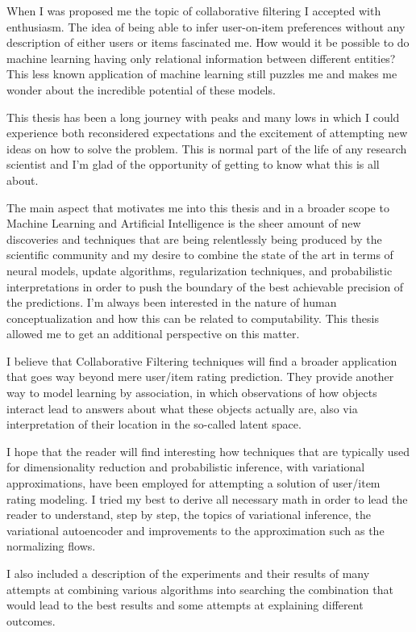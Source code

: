 
When I was proposed me the topic
of collaborative filtering
I accepted with enthusiasm.
The idea of being able to infer user-on-item preferences
without any description of either users
or items fascinated me. How would it be
possible to do machine learning
having only relational information between different
entities? This less known application of machine learning still puzzles me and makes me
wonder about the incredible potential of these models.

This thesis has been a long journey with peaks and many lows in which I could
experience both reconsidered expectations and the excitement of attempting new 
ideas on how to solve the problem. 
This is normal part of the life of any research scientist
and I'm glad of the opportunity of getting to know what this is all about.

The main aspect that motivates me into this thesis and in a broader scope to
Machine Learning and Artificial Intelligence is the sheer amount of new discoveries and
techniques that are being relentlessly being produced by the scientific community
and my desire to combine the state of the art in terms of neural models, 
update algorithms,
regularization techniques,
and probabilistic interpretations in order to push the boundary
of the best achievable precision of the predictions.
I'm always been interested in the nature of human conceptualization
and how this can be related to computability. This thesis
allowed me to get an additional perspective on this matter.

I believe that Collaborative Filtering techniques will find a broader application
that goes way beyond mere user/item rating prediction. They provide another way
to model learning by association, in which observations of how objects interact
lead to answers about what these objects actually are, also via interpretation
of their location in the so-called latent space.

I hope that the reader will find interesting how techniques that are typically
used for dimensionality reduction and probabilistic inference, with variational
approximations, have been employed for attempting a solution of
user/item rating modeling. I tried my best to derive all necessary math
in order to lead the reader to understand, step by step, the topics of
variational inference, the variational autoencoder and improvements to
the approximation such as the normalizing flows.

I also included a description of the experiments and their results of
many attempts at combining various algorithms
into searching
the combination that would lead to the best results
and some attempts at explaining different outcomes.
